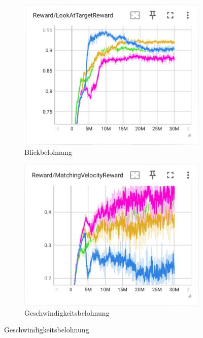 \begin{figure}[H]
\begin{subfigure}{.49\textwidth}
    \end{subfigure}
     \begin{subfigure}{.49\textwidth}
      \centering  
      \includegraphics[width=\textwidth]{img/116_130_131_132_look_reward}
      \caption{Blickbelohnung}
      \label{fig:116_130_131_132_look_reward}
    \end{subfigure}
    \begin{subfigure}{.49\textwidth}
      \centering  
      \includegraphics[width=\textwidth]{img/116_130_131_132_vel_reward}
      \caption{Geschwindigkeitsbelohnung}
      \label{fig:116_130_131_132_vel_reward}

\end{subfigure}
\end{figure}
